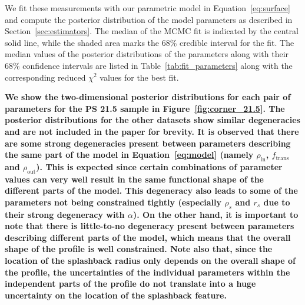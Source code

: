 \documentclass[iop, apjl, twocolappendix, numberedappendix]{emulateapj}
\begin{document}
We fit these measurements with our parametric model in Equation~\ref{eq:surface}
and compute the posterior distribution of the model parameters
as described in Section~\ref{sec:estimators}. The
median of the MCMC fit is indicated by the central solid line, while
the shaded area marks the 68\% credible interval for the fit. The
median values of the posterior distributions of the parameters along
with their 68\% confidence intervals are listed in
Table~\ref{tab:fit_parameters} along with the corresponding reduced
$\chi^2$ values for the best fit.

\textbf{We show the two-dimensional posterior distributions for each pair of
parameters for the PS 21.5 sample in Figure~\ref{fig:corner_21.5}. The
posterior distributions for the other datasets show similar degeneracies and
are not included in the paper for brevity.
It is observed that there are some strong degeneracies present between
parameters describing the same part of the model in Equation~\ref{eq:model}
(namely $\rho_{\mathrm{in}}$, $f_{\mathrm{trans}}$ and $\rho_{\mathrm{out}}$).
This is expected since certain combinations of parameter values can
very well result in the same functional shape of the different parts of
the model. This degeneracy also leads to some of the parameters not being
constrained tightly (especially $\rho_s$ and $r_s$ due to their strong degeneracy
with $\alpha$). On the other hand, it is important to note that there is
little-to-no degeneracy present between parameters describing different parts
of the model, which means that the overall shape of the profile is well
constrained.  Note also that, since the location of the splashback radius only
depends on the overall shape of the profile, the uncertainties of the
individual parameters within the independent parts of the profile do not
translate into a huge uncertainty on the location of the splashback feature.}
\end{document}
